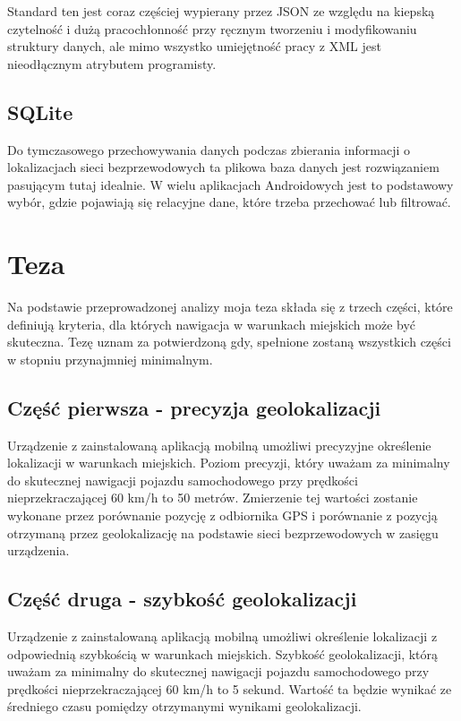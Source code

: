 Standard ten jest coraz częściej wypierany przez JSON ze względu na kiepską czytelność i dużą pracochłonność przy ręcznym tworzeniu i modyfikowaniu struktury danych, ale mimo wszystko umiejętność pracy z XML jest nieodłącznym atrybutem programisty.

\subsection{SQLite}
Do tymczasowego przechowywania danych podczas zbierania informacji o lokalizacjach sieci bezprzewodowych ta plikowa baza danych jest rozwiązaniem pasującym tutaj idealnie. W wielu aplikacjach Androidowych jest to podstawowy wybór, gdzie pojawiają się relacyjne dane, które trzeba przechować lub filtrować.

\section{Teza}
Na podstawie przeprowadzonej analizy moja teza składa się z trzech części, które definiują kryteria, dla których nawigacja w warunkach miejskich może być skuteczna. Tezę uznam za potwierdzoną gdy, spełnione zostaną wszystkich części w stopniu przynajmniej minimalnym.

\subsection{Część pierwsza - precyzja geolokalizacji}
Urządzenie z zainstalowaną aplikacją mobilną umożliwi precyzyjne określenie lokalizacji w warunkach miejskich. Poziom precyzji, który uważam za minimalny do skutecznej nawigacji pojazdu samochodowego przy prędkości nieprzekraczającej 60 km/h to 50 metrów. Zmierzenie tej wartości zostanie wykonane przez porównanie pozycję z odbiornika GPS i porównanie z pozycją otrzymaną przez geolokalizację na podstawie sieci bezprzewodowych w zasięgu urządzenia.

\subsection{Część druga - szybkość geolokalizacji}
Urządzenie z zainstalowaną aplikacją mobilną umożliwi określenie lokalizacji z odpowiednią szybkością w warunkach miejskich. Szybkość geolokalizacji, którą uważam za minimalny do skutecznej nawigacji pojazdu samochodowego przy prędkości nieprzekraczającej 60 km/h to 5 sekund. Wartość ta będzie wynikać ze średniego czasu pomiędzy otrzymanymi wynikami geolokalizacji.

